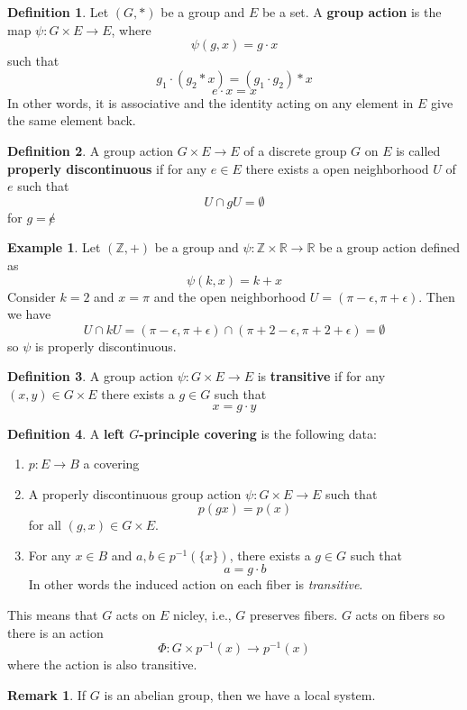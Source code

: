 \documentclass{article}
\theoremstyle{definition}
\newtheorem{exmp}{Example}[section]
\newtheorem{remark}{Remark}
\newtheorem{defn}{Definition}[section]
\newcommand{\Z}{\mathbb{Z}}
\newcommand{\R}{\mathbb{R}}
\begin{document}
\begin{defn}
Let $(G,*)$ be a group and $E$ be a set.  A \textbf{group action} is the map $\psi:G\times E \rightarrow E$, where $$\psi(g,x)=g \cdot x$$ such that $$g_1 \cdot (g_2 * x)=(g_1 \cdot g_2) * x$$  $$e\cdot x=x$$ In other words, it is associative and the identity acting on any element in $E$ give the same element back.
\end{defn}
\begin{defn}
A group action  $G\times E \rightarrow E$ of a discrete group $G$ on $E$ is called \textbf{properly discontinuous} if for any $e\in E $ there exists a open neighborhood $U$ of $e$ such that $$U \cap gU=\emptyset$$ for $g=\not e$

\end{defn}
\begin{exmp}
Let $(\Z,+)$ be a group and  $\psi: \Z\times \R \rightarrow \R$ be a group action defined as $$\psi(k,x)=k+x$$ Consider $k=2$ and $x=\pi$ and the open neighborhood $U=(\pi-\epsilon,\pi+\epsilon)$. Then we have $$U \cap kU=(\pi-\epsilon,\pi+\epsilon)\cap (\pi+2-\epsilon,\pi+2+\epsilon)=\emptyset$$ so $\psi$ is properly discontinuous. 
\end{exmp}
\begin{defn}
A group action $\psi:G\times E \rightarrow E$ is \textbf{transitive} if for any $(x,y)\in G \times E$ there exists a $g\in G$ such that  $$x=g\cdot y$$
\end{defn}
\begin{defn}
A \textbf{left $G$-principle covering} is the following data:
\begin{enumerate}
    \item $p: E \rightarrow B$ a covering
    \item A properly discontinuous group action $\psi:G\times E \rightarrow E$ such that $$p(gx)=p(x)$$ for all $(g,x)\in G \times E$.
    \item For any $x \in B$ and $a,b \in p^{-1}(\{x\})$, there exists a $g\in G$ such that $$a=g\cdot b$$ In other words the induced action on each fiber is \textit{transitive}.
    \end{enumerate}
\end{defn}
\noindent This means that $G$ acts on $E$ nicley, i.e., $G$ preserves fibers. $G$ acts on fibers so there is an action $$\Phi: G \times p^{-1}(x)\rightarrow p^{-1}(x)$$ where the action is also transitive.  
\begin{remark}
If $G$ is an abelian group, then we have a local system. 
\end{remark}
\end{document}
